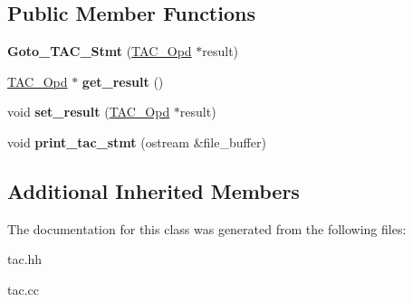 \subsection*{Public Member Functions}
\begin{DoxyCompactItemize}
\item 
\mbox{\label{classGoto__TAC__Stmt_a787f210c9dcb0809abdab9c6b7f594cd}} 
{\bfseries Goto\+\_\+\+T\+A\+C\+\_\+\+Stmt} (\hyperlink{classTAC__Opd}{T\+A\+C\+\_\+\+Opd} $\ast$result)
\item 
\mbox{\label{classGoto__TAC__Stmt_a30332b7ee16239b848174152a0b2d7b3}} 
\hyperlink{classTAC__Opd}{T\+A\+C\+\_\+\+Opd} $\ast$ {\bfseries get\+\_\+result} ()
\item 
\mbox{\label{classGoto__TAC__Stmt_a156ec78b2ed1c5b1d1be54213d151354}} 
void {\bfseries set\+\_\+result} (\hyperlink{classTAC__Opd}{T\+A\+C\+\_\+\+Opd} $\ast$result)
\item 
\mbox{\label{classGoto__TAC__Stmt_ae3dff8f35b92af225024d0e0d5f0a455}} 
void {\bfseries print\+\_\+tac\+\_\+stmt} (ostream \&file\+\_\+buffer)
\end{DoxyCompactItemize}
\subsection*{Additional Inherited Members}


The documentation for this class was generated from the following files\+:\begin{DoxyCompactItemize}
\item 
tac.\+hh\item 
tac.\+cc\end{DoxyCompactItemize}
